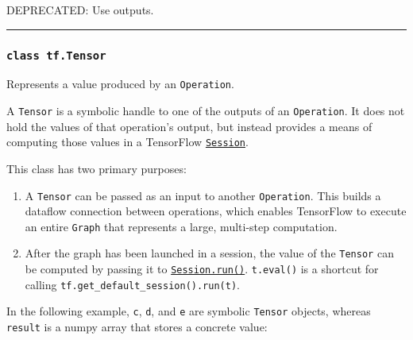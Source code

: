 DEPRECATED: Use outputs.

\begin{center}\rule{0.5\linewidth}{\linethickness}\end{center}

\subsubsection{\texorpdfstring{\lstinline{class tf.Tensor}
}{class tf.Tensor }}\label{class-tf.tensor}

Represents a value produced by an \lstinline{Operation}.

A \lstinline{Tensor} is a symbolic handle to one of the outputs of an
\lstinline{Operation}. It does not hold the values of that operation's
output, but instead provides a means of computing those values in a
TensorFlow
\href{../../api_docs/python/client.md\#Session}{\lstinline{Session}}.

This class has two primary purposes:

\begin{enumerate}
\def\labelenumi{\arabic{enumi}.}
\item
  A \lstinline{Tensor} can be passed as an input to another
  \lstinline{Operation}. This builds a dataflow connection between
  operations, which enables TensorFlow to execute an entire
  \lstinline{Graph} that represents a large, multi-step computation.
\item
  After the graph has been launched in a session, the value of the
  \lstinline{Tensor} can be computed by passing it to
  \href{../../api_docs/python/client.md\#Session.run}{\lstinline{Session.run()}}.
  \lstinline{t.eval()} is a shortcut for calling
  \lstinline{tf.get_default_session().run(t)}.
\end{enumerate}

In the following example, \lstinline{c}, \lstinline{d}, and \lstinline{e} are
symbolic \lstinline{Tensor} objects, whereas \lstinline{result} is a numpy
array that stores a concrete value:

\begin{Shaded}
\begin{Highlighting}[]
\OperatorTok{=} \NormalTok{tf.constant([[}\NormalTok{, }\NormalTok{], [}\NormalTok{, }\NormalTok{]])}
\OperatorTok{=} \NormalTok{tf.constant([[}\NormalTok{, }\NormalTok{], [}\NormalTok{, }\NormalTok{]])}
\OperatorTok{=} 

\OperatorTok{=} 

\OperatorTok{=} 
\end{Highlighting}
\end{Shaded}

